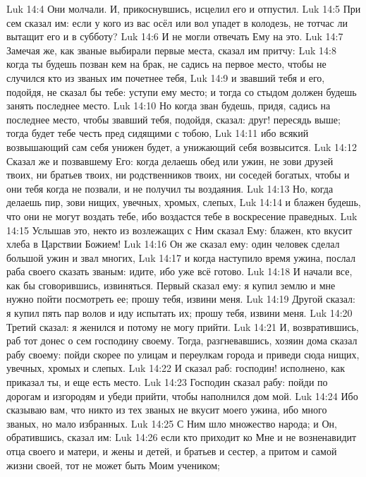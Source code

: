 \vs Luk 14:4 Они молчали. И, прикоснувшись, исцелил его и отпустил.
\vs Luk 14:5 При сем сказал им: если у кого из вас осёл или вол упадет в колодезь, не тотчас ли вытащит его и в субботу?
\vs Luk 14:6 И не могли отвечать Ему на это.
\rsbpar\vs Luk 14:7 Замечая же, как званые выбирали первые места, сказал им притчу:
\vs Luk 14:8 когда ты будешь позван кем на брак, не садись на первое место, чтобы не случился кто из званых им почетнее тебя,
\vs Luk 14:9 и звавший тебя и его, подойдя, не сказал бы тебе: уступи ему место; и тогда со стыдом должен будешь занять последнее место.
\vs Luk 14:10 Но когда зван будешь, придя, садись на последнее место, чтобы звавший тебя, подойдя, сказал: друг! пересядь выше; тогда будет тебе честь пред сидящими с тобою,
\vs Luk 14:11 ибо всякий возвышающий сам себя унижен будет, а унижающий себя возвысится.
\vs Luk 14:12 Сказал же и позвавшему Его: когда делаешь обед или ужин, не зови друзей твоих, ни братьев твоих, ни родственников твоих, ни соседей богатых, чтобы и они тебя когда не позвали, и не получил ты воздаяния.
\vs Luk 14:13 Но, когда делаешь пир, зови нищих, увечных, хромых, слепых,
\vs Luk 14:14 и блажен будешь, что они не могут воздать тебе, ибо воздастся тебе в воскресение праведных.
\vs Luk 14:15 Услышав это, некто из возлежащих с Ним сказал Ему: блажен, кто вкусит хлеба в Царствии Божием!
\vs Luk 14:16 Он же сказал ему: один человек сделал большой ужин и звал многих,
\vs Luk 14:17 и когда наступило время ужина, послал раба своего сказать званым: идите, ибо уже всё готово.
\vs Luk 14:18 И начали все, как бы сговорившись, извиняться. Первый сказал ему: я купил землю и мне нужно пойти посмотреть ее; прошу тебя, извини меня.
\vs Luk 14:19 Другой сказал: я купил пять пар волов и иду испытать их; прошу тебя, извини меня.
\vs Luk 14:20 Третий сказал: я женился и потому не могу прийти.
\vs Luk 14:21 И, возвратившись, раб тот донес о сем господину своему. Тогда, разгневавшись, хозяин дома сказал рабу своему: пойди скорее по улицам и переулкам города и приведи сюда нищих, увечных, хромых и слепых.
\vs Luk 14:22 И сказал раб: господин! исполнено, как приказал ты, и еще есть место.
\vs Luk 14:23 Господин сказал рабу: пойди по дорогам и изгородям и убеди прийти, чтобы наполнился дом мой.
\vs Luk 14:24 Ибо сказываю вам, что никто из тех званых не вкусит моего ужина, ибо много званых, но мало избранных.
\rsbpar\vs Luk 14:25 С Ним шло множество народа; и Он, обратившись, сказал им:
\vs Luk 14:26 если кто приходит ко Мне и не возненавидит отца своего и матери, и жены и детей, и братьев и сестер, а притом и самой жизни своей, тот не может быть Моим учеником;
